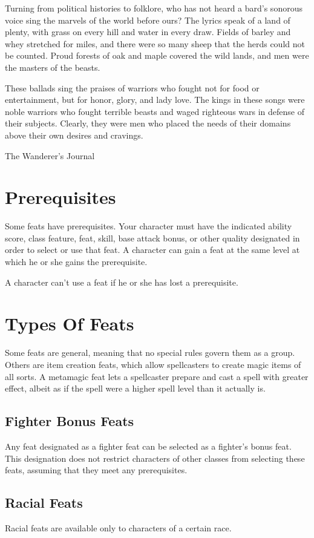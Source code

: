 {Turning from political histories to folklore, who has not heard a bard's sonorous voice sing the marvels of the world before ours? The lyrics speak of a land of plenty, with grass on every hill and water in every draw. Fields of barley and whey stretched for miles, and there were so many sheep that the herds could not be counted. Proud forests of oak and maple covered the wild lands, and men were the masters of the beasts.

These ballads sing the praises of warriors who fought not for food or entertainment, but for honor, glory, and lady love. The kings in these songs were noble warriors who fought terrible beasts and waged righteous wars in defense of their subjects. Clearly, they were men who placed the needs of their domains above their own desires and cravings.}
{The Wanderer's Journal}

\section{Prerequisites}
Some feats have prerequisites. Your character must have the indicated ability score, class feature, feat, skill, base attack bonus, or other quality designated in order to select or use that feat. A character can gain a feat at the same level at which he or she gains the prerequisite.

A character can't use a feat if he or she has lost a prerequisite.

\section{Types Of Feats}
Some feats are general, meaning that no special rules govern them as a group. Others are item creation feats, which allow spellcasters to create magic items of all sorts. A metamagic feat lets a spellcaster prepare and cast a spell with greater effect, albeit as if the spell were a higher spell level than it actually is.

\subsection{Fighter Bonus Feats}
Any feat designated as a fighter feat can be selected as a fighter's bonus feat. This designation does not restrict characters of other classes from selecting these feats, assuming that they meet any prerequisites.

\subsection{Racial Feats}
Racial feats are available only to characters of a certain race. 

